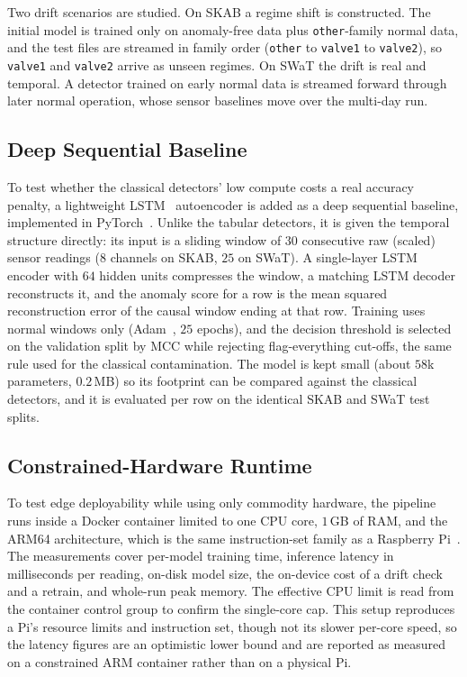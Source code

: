 \documentclass[runningheads]{llncs}
\begin{document}
Two drift scenarios are studied. On SKAB a regime shift is constructed. The
initial model is trained only on anomaly-free data plus \texttt{other}-family
normal data, and the test files are streamed in family order
(\texttt{other} to \texttt{valve1} to \texttt{valve2}), so \texttt{valve1} and
\texttt{valve2} arrive as unseen regimes. On SWaT the drift is real and temporal.
A detector trained on early normal data is streamed forward through later normal
operation, whose sensor baselines move over the multi-day run.

\subsection{Deep Sequential Baseline}
\label{sec:deepmethod}
To test whether the classical detectors' low compute costs a real accuracy
penalty, a lightweight LSTM~\cite{hochreiter1997} autoencoder is added as a deep
sequential baseline, implemented in PyTorch~\cite{paszke2019}. Unlike the tabular
detectors, it is given the temporal structure directly: its input is a sliding
window of $30$ consecutive raw (scaled) sensor readings ($8$ channels on SKAB,
$25$ on SWaT). A single-layer LSTM encoder with $64$ hidden units compresses the
window, a matching LSTM decoder reconstructs it, and the anomaly score for a row
is the mean squared reconstruction error of the causal window ending at that row.
Training uses normal windows only (Adam~\cite{kingma2015}, $25$ epochs), and the
decision threshold is selected on the validation split by MCC while rejecting
flag-everything cut-offs, the same rule used for the classical contamination. The
model is kept small (about $58$k parameters, $0.2$\,MB) so its footprint can be
compared against the classical detectors, and it is evaluated per row on the
identical SKAB and SWaT test splits.

\subsection{Constrained-Hardware Runtime}
To test edge deployability while using only commodity hardware, the pipeline runs
inside a Docker container limited to one CPU core, $1$\,GB of RAM, and the ARM64
architecture, which is the same instruction-set family as a Raspberry
Pi~\cite{merkel2014}. The measurements cover per-model training time, inference
latency in milliseconds per reading, on-disk model size, the on-device cost of a
drift check and a retrain, and whole-run peak memory. The effective CPU limit is
read from the container control group to confirm the single-core cap. This setup
reproduces a Pi's resource limits and instruction set, though not its slower
per-core speed, so the latency figures are an optimistic lower bound and are
reported as measured on a constrained ARM container rather than on a physical Pi.
\end{document}
